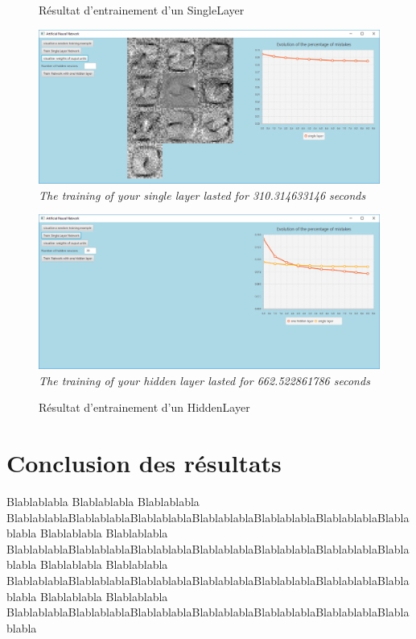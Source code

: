 \begin{figure}[!htb]
  \centering
    \caption{Résultat d'entrainement d'un SingleLayer}
    \includegraphics[width=\textwidth]{single.png}
	\textit {The training of your single layer lasted for 310.314633146 seconds}
\newline \newline

  \centering
    \caption{Résultat d'entrainement d'un HiddenLayer}
    \includegraphics[width=\textwidth]{hidden.png}
	\textit {The training of your hidden layer lasted for 662.522861786 seconds}

\end{figure}




\section{Conclusion des résultats}

Blablablabla Blablablabla Blablablabla BlablablablaBlablablablaBlablablablaBlablablablaBlablablablaBlablablablaBlablablabla Blablablabla Blablablabla BlablablablaBlablablablaBlablablablaBlablablablaBlablablablaBlablablablaBlablablabla Blablablabla Blablablabla BlablablablaBlablablablaBlablablablaBlablablablaBlablablablaBlablablablaBlablablabla Blablablabla Blablablabla BlablablablaBlablablablaBlablablablaBlablablablaBlablablablaBlablablablaBlablablabla
\clearpage

